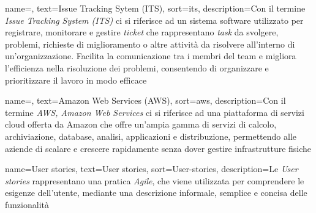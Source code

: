 






 {
    name=,
    text=Issue Tracking Sytem (ITS),
    sort=its,
    description={Con il termine \emph{Issue Tracking System (ITS) } ci si riferisce ad un sistema software utilizzato per registrare, monitorare e gestire \textit{ticket} che rappresentano \textit{task} da svolgere, problemi, richieste di miglioramento o altre attività da risolvere all’interno di un’organizzazione. Facilita la comunicazione tra i membri del team e migliora l’efficienza nella risoluzione dei problemi, consentendo di organizzare e prioritizzare il lavoro in modo efficace}
}

 {
    name=,
    text=Amazon Web Services (AWS),
    sort=aws,
    description={Con il termine \emph{AWS, Amazon Web Services} ci si riferisce ad una piattaforma di servizi cloud offerta da Amazon che offre un’ampia gamma di servizi di calcolo, archiviazione, database, analisi, applicazioni e distribuzione, permettendo alle aziende di scalare e crescere rapidamente senza dover gestire infrastrutture fisiche}
}

 {
    name=User stories,
    text=User stories,
    sort=User-stories,
    description={Le \emph{User stories} rappresentano una pratica \textit{Agile}, che viene utilizzata per comprendere le esigenze dell'utente, mediante una descrizione informale, semplice e concisa delle funzionalità}
}


